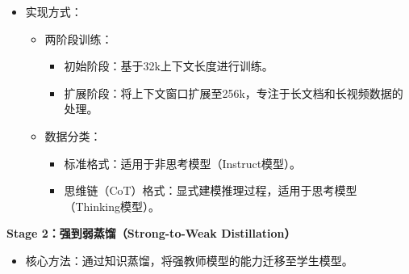 \documentclass[zihao=false,fontset=windows]{ctexart}
\begin{document}
\begin{itemize}[label=\textcolor{feishuBlue}{\textbullet}]
\item 实现方式：
\begin{itemize}[label=\textcolor{feishuBlue}{\textbullet}]
\item 两阶段训练：
\begin{itemize}[label=\textcolor{feishuBlue}{i.}]
\item 初始阶段：基于32k上下文长度进行训练。

\end{itemize}

\begin{itemize}[label=\textcolor{feishuBlue}{ii.}]
\item 扩展阶段：将上下文窗口扩展至256k，专注于长文档和长视频数据的处理。

\end{itemize}

\end{itemize}

\begin{itemize}[label=\textcolor{feishuBlue}{\textbullet}]
\item 数据分类：
\begin{itemize}[label=\textcolor{feishuBlue}{\textbullet}]
\item 标准格式：适用于非思考模型（Instruct模型）。

\end{itemize}

\begin{itemize}[label=\textcolor{feishuBlue}{\textbullet}]
\item 思维链（CoT）格式：显式建模推理过程，适用于思考模型（Thinking模型）。

\end{itemize}

\end{itemize}

\end{itemize}

\textbf{Stage 2：强到弱蒸馏（Strong-to-Weak Distillation）}\par

\begin{itemize}[label=\textcolor{feishuBlue}{\textbullet}]
\item 核心方法：通过知识蒸馏，将强教师模型的能力迁移至学生模型。

\end{itemize}
\end{document}
